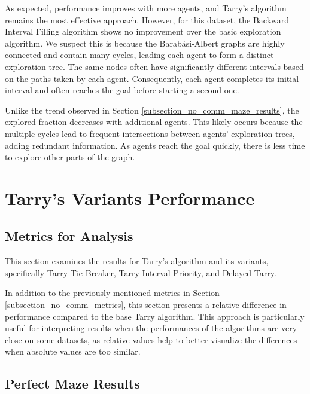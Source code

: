 As expected, performance improves with more agents, and Tarry's algorithm remains the most effective approach. However, for this dataset, the Backward Interval Filling algorithm shows no improvement over the basic exploration algorithm. We suspect this is because the Barabási-Albert graphs are highly connected and contain many cycles, leading each agent to form a distinct exploration tree. The same nodes often have significantly different intervals based on the paths taken by each agent. Consequently, each agent completes its initial interval and often reaches the goal before starting a second one.

Unlike the trend observed in Section \ref{subsection_no_comm_maze_results}, the explored fraction decreases with additional agents. This likely occurs because the multiple cycles lead to frequent intersections between agents' exploration trees, adding redundant information. As agents reach the goal quickly, there is less time to explore other parts of the graph.

\section{Tarry's Variants Performance}
\label{section_result_tarry}

\subsection{Metrics for Analysis}
\label{subsection_tarry_metrics}

This section examines the results for Tarry's algorithm and its variants, specifically Tarry Tie-Breaker, Tarry Interval Priority, and Delayed Tarry.

In addition to the previously mentioned metrics in Section \ref{subsection_no_comm_metrics}, this section presents a relative difference in performance compared to the base Tarry algorithm. This approach is particularly useful for interpreting results when the performances of the algorithms are very close on some datasets, as relative values help to better visualize the differences when absolute values are too similar.

\subsection{Perfect Maze Results} 
\label{subsection_tarry_maze_results}

